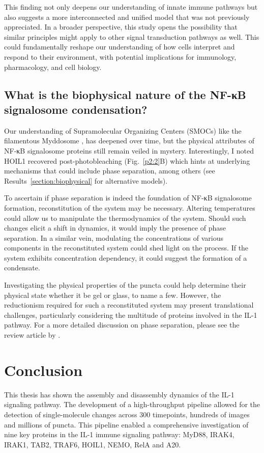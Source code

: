 This finding not only deepens our understanding of innate immune pathways but also suggests a more interconnected and unified model that was not previously appreciated. In a broader perspective, this study opens the possibility that similar principles might apply to other signal transduction pathways as well. This could fundamentally reshape our understanding of how cells interpret and respond to their environment, with potential implications for immunology, pharmacology, and cell biology.

\section{What is the biophysical nature of the NF-κB signalosome condensation?}
Our understanding of Supramolecular Organizing Centers (SMOCs) like the filamentous Myddosome \autocite{Moncrieffe_2020}, has deepened over time, but the physical attributes of NF-κB signalosome proteins still remain veiled in mystery. Interestingly, I noted HOIL1 recovered post-photobleaching (Fig.~\ref{p2:2}B) which hints at underlying mechanisms that could include phase separation, among others (see Results~\ref{section:biophysical} for alternative models).

To ascertain if phase separation is indeed the foundation of NF-κB signalosome formation, reconstitution of the system may be necessary. Altering temperatures could allow us to manipulate the thermodynamics of the system. Should such changes elicit a shift in dynamics, it would imply the presence of phase separation. In a similar vein, modulating the concentrations of various components in the reconstituted system could shed light on the process. If the system exhibits concentration dependency, it could suggest the formation of a condensate.

Investigating the physical properties of the puncta could help determine their physical state whether it be gel or glass, to name a few. However, the reductionism required for such a reconstituted system may present translational challenges, particularly considering the multitude of proteins involved in the IL-1 pathway. For a more detailed discussion on phase separation, please see the review article by \autocite{Alberti_2019}.

\chapter{Conclusion}
This thesis has shown the assembly and disassembly dynamics of the IL-1 signaling pathway. The development of a high-throughput pipeline allowed for the detection of single-molecule changes across 300 timepoints, hundreds of images and millions of puncta. This pipeline enabled a comprehensive investigation of nine key proteins in the IL-1 immune signaling pathway: MyD88, IRAK4, IRAK1, TAB2, TRAF6, HOIL1, NEMO, RelA and A20.

